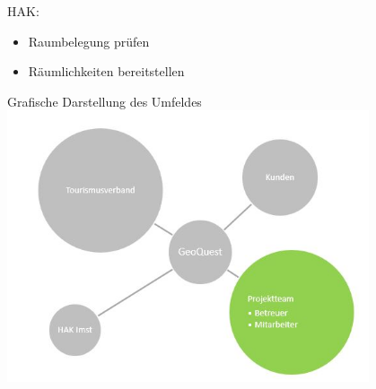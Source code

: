 \begin{itemize}
	HAK:
	\begin{itemize}
		\item Raumbelegung prüfen
		\item Räumlichkeiten bereitstellen\\
	\end{itemize}
	
	Grafische Darstellung des Umfeldes\\
	\includegraphics[height=8cm]{StakeholderGrafisch}
	
\end{itemize}
